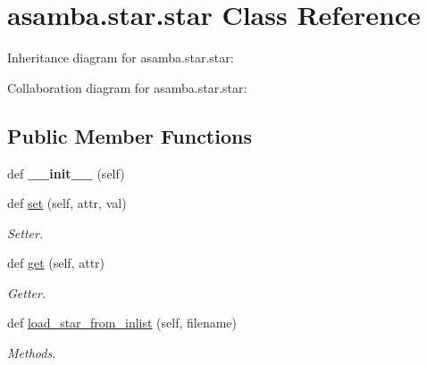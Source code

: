 \hypertarget{classasamba_1_1star_1_1star}{}\section{asamba.\+star.\+star Class Reference}
\label{classasamba_1_1star_1_1star}


Inheritance diagram for asamba.\+star.\+star\+:


Collaboration diagram for asamba.\+star.\+star\+:
\subsection*{Public Member Functions}
\begin{DoxyCompactItemize}
\item 
\mbox{\label{classasamba_1_1star_1_1star_a5e1bfb2e0171a571b99aeb125afde4a4}} 
def {\bfseries \+\_\+\+\_\+init\+\_\+\+\_\+} (self)
\item 
def \hyperlink{classasamba_1_1star_1_1star_af0cfdd4049f081617d13919decddc5af}{set} (self, attr, val)
\begin{DoxyCompactList}\small\item\em Setter. \end{DoxyCompactList}\item 
def \hyperlink{classasamba_1_1star_1_1star_a388403867f4905df1f6c983131535379}{get} (self, attr)
\begin{DoxyCompactList}\small\item\em Getter. \end{DoxyCompactList}\item 
def \hyperlink{classasamba_1_1star_1_1star_aec75624cd5c21ff1f0121012ccb01903}{load\+\_\+star\+\_\+from\+\_\+inlist} (self, filename)
\begin{DoxyCompactList}\small\item\em Methods. \end{DoxyCompactList}\end{DoxyCompactItemize}
